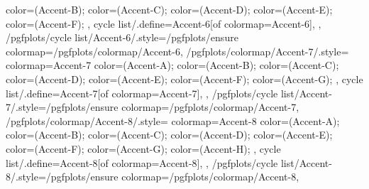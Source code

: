{{{      color=(Accent-B);
      color=(Accent-C);
      color=(Accent-D);
      color=(Accent-E);
      color=(Accent-F);
    },
    cycle list/.define={Accent-6}{[of colormap=Accent-6]},
  },
  /pgfplots/cycle list/Accent-6/.style={/pgfplots/ensure colormap={/pgfplots/colormap/Accent-6}},
  /pgfplots/colormap/Accent-7/.style={
    colormap={Accent-7}{
      color=(Accent-A);
      color=(Accent-B);
      color=(Accent-C);
      color=(Accent-D);
      color=(Accent-E);
      color=(Accent-F);
      color=(Accent-G);
    },
    cycle list/.define={Accent-7}{[of colormap=Accent-7]},
  },
  /pgfplots/cycle list/Accent-7/.style={/pgfplots/ensure colormap={/pgfplots/colormap/Accent-7}},
  /pgfplots/colormap/Accent-8/.style={
    colormap={Accent-8}{
      color=(Accent-A);
      color=(Accent-B);
      color=(Accent-C);
      color=(Accent-D);
      color=(Accent-E);
      color=(Accent-F);
      color=(Accent-G);
      color=(Accent-H);
    },
    cycle list/.define={Accent-8}{[of colormap=Accent-8]},
  },
  /pgfplots/cycle list/Accent-8/.style={/pgfplots/ensure colormap={/pgfplots/colormap/Accent-8}},
}

